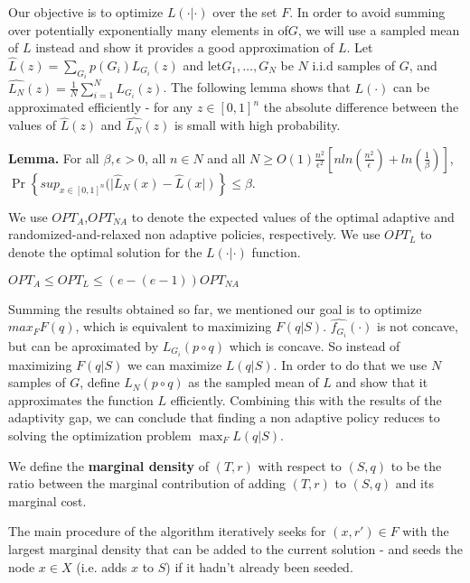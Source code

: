 Our objective is to optimize $L(\cdot|\cdot)$ over the set $F$.
In order to avoid summing over potentially exponentially many elements
in of$G$, we will use a sampled mean of $L$ instead and show it
provides a good approximation of $L$. Let $\hat{L}(z)=\sum_{G_{i}}p(G_{i})L_{G_{i}}(z)$
and let$G_{1},\ldots,G_{N}$ be $N$ i.i.d samples of $G$, and $\hat{L_{N}}(z)=\frac{1}{N}\sum_{i=1}^{N}L_{G_{i}}(z)$.
The following lemma shows that $L(\cdot)$ can be approximated efficiently
- for any $z\in[0,1]^{n}$ the absolute difference between the values
of $\hat{L}(z)$ and $\hat{L_{N}}(z)$ is small with high probability. 

\textbf{Lemma.} For all $\beta,\epsilon>0$, all $n\in N$ and all
$N\geq O(1)\frac{n^{2}}{\epsilon^{2}}[nln(\frac{n^{2}}{\epsilon})+ln(\frac{1}{\beta})]$,
$\Pr\left\{ sup_{x\in[0,1]^{n}}(|\hat{L}_{N}(x)-\hat{L}(x|)\right\} \leq\beta$.

We use $OPT_{A}$,$OPT_{NA}$ to denote the expected values of the
optimal adaptive and randomized-and-relaxed non adaptive policies,
respectively. We use $OPT_{L}$ to denote the optimal solution for
the $L(\cdot|\cdot)$ function.

\begin{lemma} $OPT_{A}\leq OPT_{L}\leq(e-(e-1))OPT_{NA}$
\end{lemma}


Summing the results obtained so far, we mentioned our goal is to optimize
$max_{F}F(q)$, which is equivalent to maximizing $F(q|S)$. $\hat{f_{G_{i}}}(\cdot)$
is not concave, but can be aproximated by $L_{G_{i}}(p\circ q)$ which
is concave. So instead of maximizing $F(q|S)$ we can maximize $L(q|S)$.
In order to do that we use $N$ samples of $G$, define $L_{N}(p\circ q)$
as the sampled mean of $L$ and show that it approximates the function
$L$ efficiently. Combining this with the results of the adaptivity
gap, we can conclude that finding a non adaptive policy reduces to
solving the optimization problem $\max_{F}L(q|S)$.



We define the \textbf{marginal density} of $(T,r)$ with respect to
$(S,q)$ to be the ratio between the marginal contribution of adding
$(T,r)$ to $(S,q)$ and its marginal cost.

The main procedure of the algorithm iteratively seeks for $(x,r')\in F$
with the largest marginal density that can be added to the current
solution - and seeds the node $x\in X$ (i.e. adds $x$ to $S$) if
it hadn\textquoteright t already been seeded.

